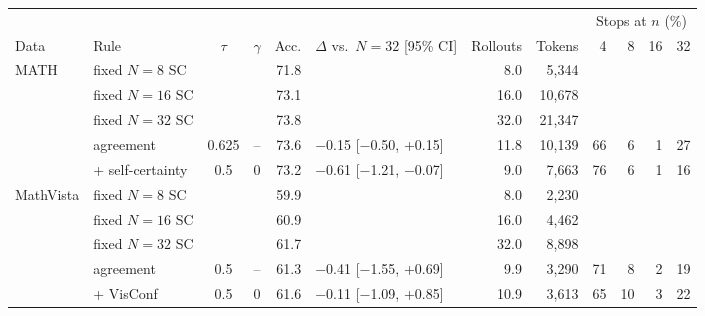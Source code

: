\setlength{\tabcolsep}{4pt}
\begin{tabular}{@{}ll cc r l rr rrrr@{}}
\toprule
 & & & & & & & & \multicolumn{4}{c}{Stops at $n$ (\%)} \\ \cmidrule(lr){9-12}
Data & Rule & $\tau$ & $\gamma$ & Acc. & $\Delta$ vs.\ $N{=}32$ [95\% CI] & Rollouts & Tokens & 4 & 8 & 16 & 32 \\
\midrule
MATH & fixed $N{=}8$ SC & & & 71.8 & & 8.0 & 5,344 & & & & \\
 & fixed $N{=}16$ SC & & & 73.1 & & 16.0 & 10,678 & & & & \\
 & fixed $N{=}32$ SC & & & 73.8 & & 32.0 & 21,347 & & & & \\
 & agreement & 0.625 & -- & 73.6 & $-$0.15 [$-$0.50, +0.15] & 11.8 & 10,139 & 66 & 6 & 1 & 27 \\
 & + self-certainty & 0.5 & 0 & 73.2 & $-$0.61 [$-$1.21, $-$0.07] & 9.0 & 7,663 & 76 & 6 & 1 & 16 \\
\midrule
MathVista & fixed $N{=}8$ SC & & & 59.9 & & 8.0 & 2,230 & & & & \\
 & fixed $N{=}16$ SC & & & 60.9 & & 16.0 & 4,462 & & & & \\
 & fixed $N{=}32$ SC & & & 61.7 & & 32.0 & 8,898 & & & & \\
 & agreement & 0.5 & -- & 61.3 & $-$0.41 [$-$1.55, +0.69] & 9.9 & 3,290 & 71 & 8 & 2 & 19 \\
 & + VisConf & 0.5 & 0 & 61.6 & $-$0.11 [$-$1.09, +0.85] & 10.9 & 3,613 & 65 & 10 & 3 & 22 \\
\bottomrule
\end{tabular}
